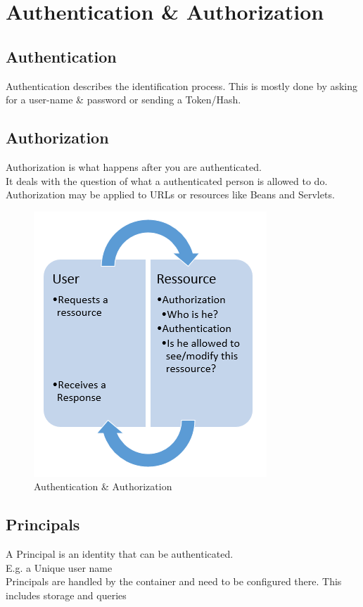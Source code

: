 \documentclass[12pt,a4paper]{report}
\begin{document}
\chapter{Authentication \& Authorization}
\section{Authentication}
Authentication describes the identification process. This is mostly done by asking for a user-name \& password or sending a Token/Hash.

\section{Authorization}
Authorization is what happens after you are authenticated.\\
It deals with the question of what a authenticated person is allowed to do.\\
Authorization may be applied to URLs or resources like Beans and Servlets.\\

\begin{figure}[h]
	\centering
	\includegraphics[width=0.5\linewidth]{res/AuthenAuthor}
	\caption{Authentication \& Authorization}
	\label{fig:AuthenAuthor}
\end{figure}

\section{Principals}
A Principal is an identity that can be authenticated.\\
E.g. a Unique user name\\
Principals are handled by the container and need to be configured there. This includes storage and queries\\
\end{document}
